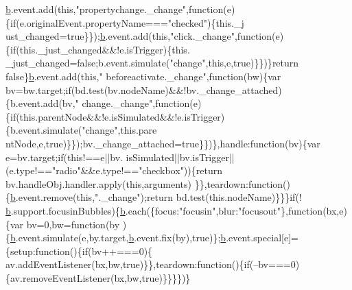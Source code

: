 \begin{DoxyCode}
      \hyperlink{jquery_8js_aa4026ad5544b958e54ce5e106fa1c805}{b}.event.add(\textcolor{keyword}{this},\textcolor{stringliteral}{"propertychange.\_change"},\textcolor{keyword}{function}(e)\{\textcolor{keywordflow}{if}(e.originalEvent.propertyName===\textcolor{stringliteral}{"checked"})\{this.\_j
      ust\_changed=true\}\});\hyperlink{jquery_8js_aa4026ad5544b958e54ce5e106fa1c805}{b}.event.add(\textcolor{keyword}{this},\textcolor{stringliteral}{"click.\_change"},\textcolor{keyword}{function}(e)\{\textcolor{keywordflow}{if}(this.\_just\_changed&&!e.isTrigger)\{this.
      \_just\_changed=false;b.event.simulate(\textcolor{stringliteral}{"change"},this,e,true)\}\})\}\textcolor{keywordflow}{return} \textcolor{keyword}{false}\}\hyperlink{jquery_8js_aa4026ad5544b958e54ce5e106fa1c805}{b}.event.add(\textcolor{keyword}{this},\textcolor{stringliteral}{"
      beforeactivate.\_change"},\textcolor{keyword}{function}(bw)\{var bv=bw.target;if(bd.test(bv.nodeName)&&!bv.\_change\_attached)\{b.event.add(bv,\textcolor{stringliteral}{"
      change.\_change"},function(e)\{if(this.parentNode&&!e.isSimulated&&!e.isTrigger)\{b.event.simulate(\textcolor{stringliteral}{"change"},this.pare
      ntNode,e,true)\}\});bv.\_change\_attached=true\}\})\},handle:\textcolor{keyword}{function}(bv)\{var e=bv.target;\textcolor{keywordflow}{if}(\textcolor{keyword}{this}!==e||bv.
      isSimulated||bv.isTrigger||(e.type!==\textcolor{stringliteral}{"radio"}&&e.type!==\textcolor{stringliteral}{"checkbox"}))\{\textcolor{keywordflow}{return} bv.handleObj.handler.apply(\textcolor{keyword}{this},arguments)
      \}\},teardown:\textcolor{keyword}{function}()\{\hyperlink{jquery_8js_aa4026ad5544b958e54ce5e106fa1c805}{b}.event.remove(\textcolor{keyword}{this},\textcolor{stringliteral}{".\_change"});\textcolor{keywordflow}{return} bd.test(this.nodeName)\}\}\}\textcolor{keywordflow}{if}(!
      \hyperlink{jquery_8js_aa4026ad5544b958e54ce5e106fa1c805}{b}.support.focusinBubbles)\{\hyperlink{jquery_8js_aa4026ad5544b958e54ce5e106fa1c805}{b}.each(\{focus:\textcolor{stringliteral}{"focusin"},blur:\textcolor{stringliteral}{"focusout"}\},\textcolor{keyword}{function}(bx,e)\{var bv=0,bw=\textcolor{keyword}{function}(by
      )\{\hyperlink{jquery_8js_aa4026ad5544b958e54ce5e106fa1c805}{b}.event.simulate(e,by.target,\hyperlink{jquery_8js_aa4026ad5544b958e54ce5e106fa1c805}{b}.event.fix(by),\textcolor{keyword}{true})\};\hyperlink{jquery_8js_aa4026ad5544b958e54ce5e106fa1c805}{b}.event.special[e]=\{setup:\textcolor{keyword}{function}()\{\textcolor{keywordflow}{if}(bv++===0)\{
      av.addEventListener(bx,bw,\textcolor{keyword}{true})\}\},teardown:\textcolor{keyword}{function}()\{\textcolor{keywordflow}{if}(--bv===0)\{av.removeEventListener(bx,bw,\textcolor{keyword}{true})\}\}\}\})\}

\end{DoxyCode}
